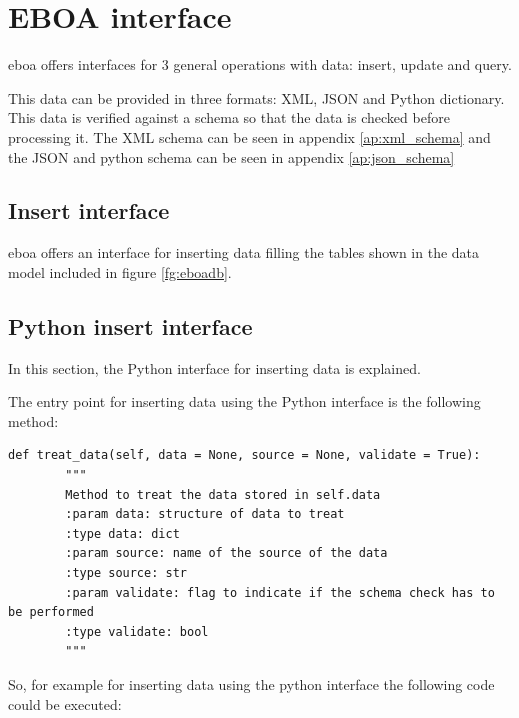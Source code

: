 \chapter{EBOA interface}

\acrshort{eboa} offers interfaces for 3 general operations with data: insert, update and query.

This data can be provided in three formats: XML, JSON and Python dictionary. This data is verified against a schema so that the data is checked before processing it. The XML schema can be seen in appendix \ref{ap:xml_schema} and the JSON and python schema can be seen in appendix \ref{ap:json_schema}

\section{Insert interface}

\acrshort{eboa} offers an interface for inserting data filling the tables shown in the data model included in figure \ref{fg:eboadb}.

\section{Python insert interface}

In this section, the Python interface for inserting data is explained.

The entry point for inserting data using the Python interface is the following method:

\begin{lstlisting}[style=python]
    def treat_data(self, data = None, source = None, validate = True):
        """
        Method to treat the data stored in self.data
        :param data: structure of data to treat
        :type data: dict 
        :param source: name of the source of the data
        :type source: str
        :param validate: flag to indicate if the schema check has to be performed
        :type validate: bool
        """  
\end{lstlisting}

So, for example for inserting data using the python interface the following code could be executed:

